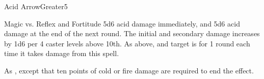 \begin{spellsection}{Acid Arrow}{Greater}{5}
\begin{spellheader}
\end{spellheader}
\begin{spellcontent}
    \begin{spelltargetinginfo}
    \end{spelltargetinginfo}
    \begin{spelleffects}
        \begin{spellattack}{Magic vs. Reflex and Fortitude}
            \spellsuccess[Reflex] 5d6 acid damage immediately, and 5d6 acid damage at the end of the next round. The initial and secondary damage increases by 1d6 per 4 caster levels above 10th.
             As above, and target is \staggered for 1 round each time it takes damage from this spell.
        \end{spellattack}
    \end{spelleffects}
\end{spellcontent}
\begin{spellfooter}
    \spellnotes As , except that ten points of cold or fire damage are required to end the effect.
\end{spellfooter}
\end{spellsection}

